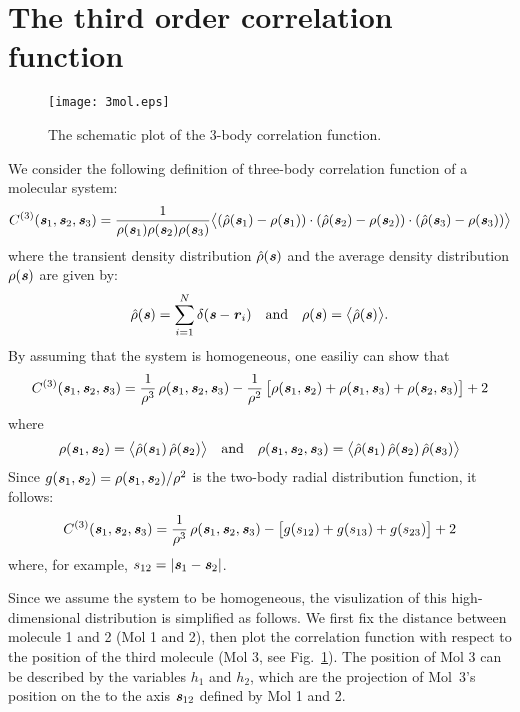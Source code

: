\documentclass[aip,jcp,a4paper,reprint,onecolumn]{revtex4-1}
\newcommand{\redc}[1]{{\color{red} #1}}
\newcommand{\vect}[1]{\textbf{\textit{#1}}}
\newcommand{\corr}{C^{(3)}}
\begin{document}
\section{\redc{The third order correlation function}}
\label{app:3}
\redc{
\begin{figure}
  \centering
  \texttt{[image: 3mol.eps]}
  \caption{The schematic plot of the 3-body correlation function.}\label{fig:tmp3}
\end{figure}
We consider the following definition of three-body correlation function of a molecular system:
\begin{align}
  \corr (\vect s_1, \vect s_2, \vect s_3)
  =
  \frac1{\rho(\vect s_1)\rho(\vect s_2)\rho(\vect s_3)}
  \big\langle
  (\hat\rho(\vect s_1) - \rho(\vect s_1))\cdot
  (\hat\rho(\vect s_2) - \rho(\vect s_2))\cdot
  (\hat\rho(\vect s_3) - \rho(\vect s_3))
  \big\rangle
\end{align}
where the transient density distribution $\hat\rho(\vect s)$ and the
average density distribution $\rho(\vect s)$ are given
by:
\begin{align}
  \hat\rho(\vect s) = \sum_{i=1}^N\delta(\vect s - \vect r_i)
  \quad\textrm{and}\quad
  \rho(\vect s) = \big\langle \hat\rho(\vect s)\big\rangle.
\end{align}
By assuming that the system is homogeneous, one easiliy can show that
\begin{align}
  \corr (\vect s_1, \vect s_2, \vect s_3)
  =
  \frac1{\rho^3}\,\rho(\vect s_1, \vect s_2, \vect s_3) -
  \frac1{\rho^2}\,\big[
  \rho(\vect s_1, \vect s_2) +
  \rho(\vect s_1, \vect s_3) +
  \rho(\vect s_2, \vect s_3)
  \big] + 2
\end{align}
where
\begin{align}
  \rho(\vect s_1, \vect s_2)
  =
  \big\langle
  \hat\rho(\vect s_1)\,  \hat\rho(\vect s_2)
  \big\rangle
  \quad\textrm{and}\quad
  \rho(\vect s_1, \vect s_2, \vect s_3)
  =
  \big\langle
  \hat\rho(\vect s_1)\,  \hat\rho(\vect s_2)\, \hat\rho(\vect s_3)
  \big\rangle  
\end{align}
Since $g (\vect s_1, \vect s_2) = \rho(\vect s_1, \vect s_2)/\rho^2$
is the two-body radial distribution function, it follows:
\begin{align}
  \corr (\vect s_1, \vect s_2, \vect s_3)
  =
  \frac1{\rho^3}\,\rho(\vect s_1, \vect s_2, \vect s_3) -
  \big[
  g(s_{12}) +
  g(s_{13}) +
  g(s_{23})
  \big] + 2
\end{align}
where, for example, $s_{12} = \vert \vect s_1 -\vect s_2\vert$.

Since we assume the system to be homogeneous, the visulization of this high-dimensional
distribution is simplified as follows. We first fix the distance between molecule 1 and 2 (Mol 1 and 2), then plot the correlation function with
respect to the position of the third molecule (Mol 3, see
Fig.~\ref{fig:tmp3}).  The position of Mol 3 can be described by
the variables $h_1$ and $h_2$, which are
the projection of Mol~3's position on the to the
axis $\vect s_{12}$ defined by Mol 1 and 2.}
\end{document}
